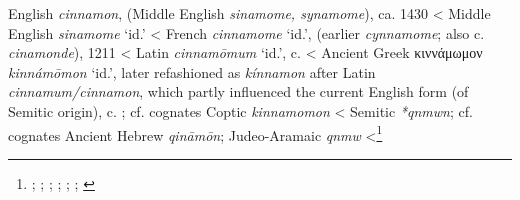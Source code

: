 \begin{etymology}\label{ety:cinnamon}
English \textit{cinnamon}, (Middle English \textit{sinamome, synamome}), ca. 1430
< Middle English \textit{sinamome} `id.'
< French \textit{cinnamome} `id.', (earlier \textit{cynnamome}; also  c. \textit{cinamonde}), 1211
< Latin \textit{cinnamōmum} `id.',  c. \AD{}
< Ancient Greek {κιννάμωμον} \textit{kinnámōmon} `id.', later refashioned as \textit{kínnamon} after Latin \textit{cinnamum/cinnamon}, which partly influenced the current English form (of Semitic origin),  c. \BC{}; cf. cognates Coptic  \textit{kinnamomon}
< Semitic \textit{*qnmwn}; cf. cognates Ancient Hebrew  \textit{qināmōn}; Judeo-Aramaic  \textit{qnmw}
<\footnote{\textcite[s.v. cinnamon]{oed}; \textcite{oe}; \textcite{tlfi}; \textcite{lewis_latin_1879}; \textcite[701]{beekes_etymological_2010}; \textcite[585]{klein_comprehensive_1987}; \textcite{rosol_early_2018}}
\end{etymology}